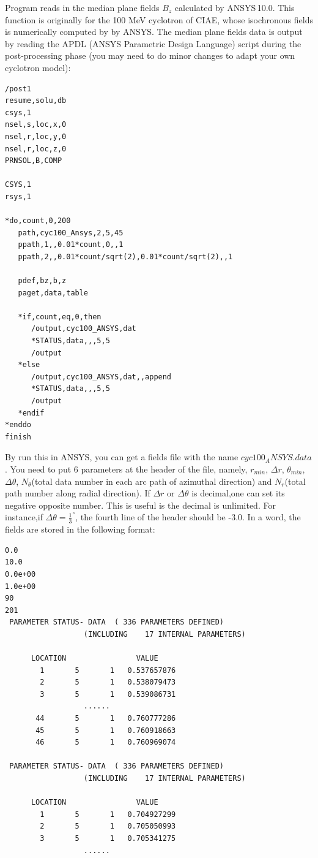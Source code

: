 Program reads in the median plane fields $B_z$ calculated by ANSYS\,10.0.  This function is originally for the 100 MeV cyclotron of CIAE,
 whose isochronous fields is numerically computed by by ANSYS. The median plane fields data is output by reading the APDL (ANSYS Parametric Design Language) script
during the post-processing phase (you may need to do minor changes to adapt your own cyclotron model):
\begin{fmpage}
\begin{footnotesize}
\begin{verbatim}
/post1
resume,solu,db
csys,1
nsel,s,loc,x,0
nsel,r,loc,y,0
nsel,r,loc,z,0
PRNSOL,B,COMP

CSYS,1
rsys,1

*do,count,0,200
   path,cyc100_Ansys,2,5,45
   ppath,1,,0.01*count,0,,1
   ppath,2,,0.01*count/sqrt(2),0.01*count/sqrt(2),,1

   pdef,bz,b,z
   paget,data,table
   
   *if,count,eq,0,then
      /output,cyc100_ANSYS,dat
      *STATUS,data,,,5,5
      /output
   *else
      /output,cyc100_ANSYS,dat,,append
      *STATUS,data,,,5,5
      /output
   *endif
*enddo
finish
\end{verbatim}
\end{footnotesize}
\end{fmpage}
By run this in ANSYS, you can get a fields file with the name $cyc100_ANSYS.data$. 
You need to  put 6 parameters at the header of the file, namely, $r_{min}$, $\Delta r$, $\theta_{min}$, $\Delta \theta$, 
$N_\theta$(total data number in each arc path of azimuthal direction) and $N_r$(total path number along radial direction). 
If $\Delta r$ or $\Delta \theta$ is decimal,one can set its negative opposite number. This is useful is the decimal is unlimited. 
For instance,if $\Delta \theta = \frac{1}{3}^\circ$, the fourth line of the header should be -3.0. 
In a word, the fields are stored in the following format:
\begin{fmpage}
\begin{footnotesize}
\begin{verbatim}
0.0
10.0
0.0e+00
1.0e+00
90
201
 PARAMETER STATUS- DATA  ( 336 PARAMETERS DEFINED)
                  (INCLUDING    17 INTERNAL PARAMETERS)

      LOCATION                VALUE
        1       5       1   0.537657876    
        2       5       1   0.538079473    
        3       5       1   0.539086731    
                  ......
       44       5       1   0.760777286    
       45       5       1   0.760918663    
       46       5       1   0.760969074    

 PARAMETER STATUS- DATA  ( 336 PARAMETERS DEFINED)
                  (INCLUDING    17 INTERNAL PARAMETERS)

      LOCATION                VALUE
        1       5       1   0.704927299    
        2       5       1   0.705050993    
        3       5       1   0.705341275    
                  ......
\end{verbatim}
\end{footnotesize}
\end{fmpage}


